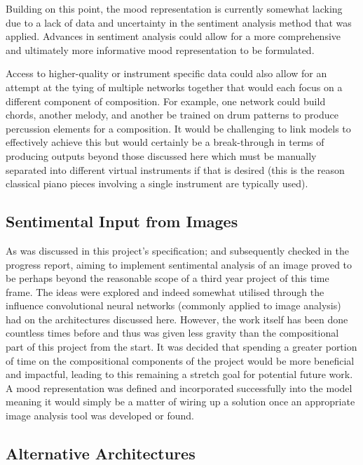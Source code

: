 \documentclass[12pt,]{article}
\begin{document}
Building on this point, the mood representation is currently somewhat
lacking due to a lack of data and uncertainty in the sentiment analysis
method that was applied. Advances in sentiment analysis could allow for
a more comprehensive and ultimately more informative mood representation
to be formulated.

Access to higher-quality or instrument specific data could also allow
for an attempt at the tying of multiple networks together that would
each focus on a different component of composition. For example, one
network could build chords, another melody, and another be trained on
drum patterns to produce percussion elements for a composition. It would
be challenging to link models to effectively achieve this but would
certainly be a break-through in terms of producing outputs beyond those
discussed here which must be manually separated into different virtual
instruments if that is desired (this is the reason classical piano
pieces involving a single instrument are typically used).

\hypertarget{sentimental-input-from-images}{%
\subsection{Sentimental Input from
Images}\label{sentimental-input-from-images}}

As was discussed in this project's specification; and subsequently
checked in the progress report, aiming to implement sentimental analysis
of an image proved to be perhaps beyond the reasonable scope of a third
year project of this time frame. The ideas were explored and indeed
somewhat utilised through the influence convolutional neural networks
(commonly applied to image analysis) had on the architectures discussed
here. However, the work itself has been done countless times before and
thus was given less gravity than the compositional part of this project
from the start. It was decided that spending a greater portion of time
on the compositional components of the project would be more beneficial
and impactful, leading to this remaining a stretch goal for potential
future work. A mood representation was defined and incorporated
successfully into the model meaning it would simply be a matter of
wiring up a solution once an appropriate image analysis tool was
developed or found.

\hypertarget{alternative-architectures}{%
\subsection{Alternative Architectures}\label{alternative-architectures}}
\end{document}
